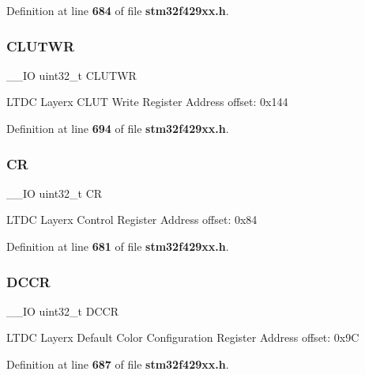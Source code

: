 Definition at line \textbf{ 684} of file \textbf{ stm32f429xx.\+h}.

\mbox{\label{structLTDC__Layer__TypeDef_a5ab25158531531e9b1cdb2bdbe66b67d}} 
\subsubsection{C\+L\+U\+T\+WR}
{\footnotesize\ttfamily \+\_\+\+\_\+\+IO uint32\+\_\+t C\+L\+U\+T\+WR}

L\+T\+DC Layerx C\+L\+UT Write Register Address offset\+: 0x144 

Definition at line \textbf{ 694} of file \textbf{ stm32f429xx.\+h}.

\mbox{\label{structLTDC__Layer__TypeDef_ab40c89c59391aaa9d9a8ec011dd0907a}} 
\subsubsection{CR}
{\footnotesize\ttfamily \+\_\+\+\_\+\+IO uint32\+\_\+t CR}

L\+T\+DC Layerx Control Register Address offset\+: 0x84 

Definition at line \textbf{ 681} of file \textbf{ stm32f429xx.\+h}.

\mbox{\label{structLTDC__Layer__TypeDef_a8aa219e1455869d3baf87a618586838d}} 
\subsubsection{D\+C\+CR}
{\footnotesize\ttfamily \+\_\+\+\_\+\+IO uint32\+\_\+t D\+C\+CR}

L\+T\+DC Layerx Default Color Configuration Register Address offset\+: 0x9C 

Definition at line \textbf{ 687} of file \textbf{ stm32f429xx.\+h}.

\mbox{\label{structLTDC__Layer__TypeDef_a30f057fd86f8f793b6ab74bbe024b9d8}} 
